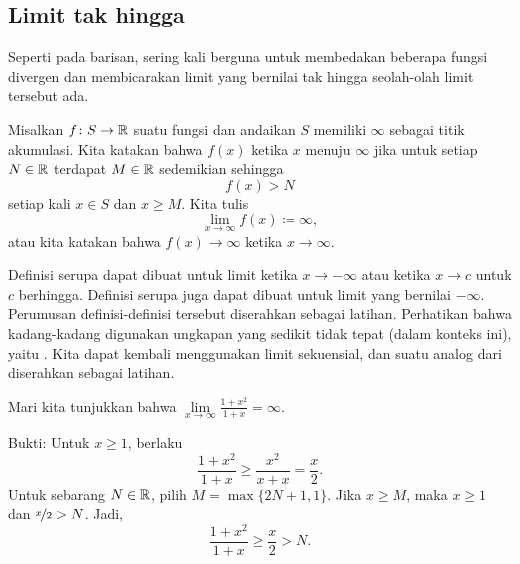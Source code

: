 \subsection{Limit tak hingga}

Seperti pada barisan, sering kali berguna untuk membedakan beberapa
fungsi divergen dan membicarakan limit yang bernilai tak hingga
seolah-olah limit tersebut ada.

\begin{defn}
%
Misalkan $f \colon S \to {\mathbb{R}}$ suatu fungsi dan andaikan
$S$ memiliki $\infty$ sebagai titik akumulasi.
Kita katakan bahwa $f(x)$
\emph{}
ketika $x$ menuju $\infty$
jika untuk setiap $N \in {\mathbb{R}}$
terdapat $M \in {\mathbb{R}}$ sedemikian sehingga
\begin{equation*}
f(x) > N
\end{equation*}
setiap kali $x \in S$ dan $x \geq M$.
Kita tulis
\begin{equation*}
\lim_{x \to \infty} f(x) \coloneqq \infty ,
\end{equation*}
atau kita katakan bahwa $f(x) \to \infty$ ketika $x \to \infty$.
\end{defn}

Definisi serupa dapat dibuat untuk limit ketika $x \to -\infty$
atau ketika $x \to c$ untuk $c$ berhingga.  Definisi serupa juga dapat
dibuat untuk limit yang bernilai $-\infty$.  Perumusan definisi-definisi tersebut
diserahkan sebagai latihan.
Perhatikan bahwa
kadang-kadang digunakan ungkapan yang sedikit tidak tepat (dalam konteks ini),
yaitu
\emph{}.
Kita dapat kembali menggunakan limit sekuensial, dan suatu analog dari
 diserahkan sebagai latihan.

\begin{example}
Mari kita tunjukkan bahwa $\lim\limits_{x \to \infty} \frac{1+x^2}{1+x} = \infty$.

Bukti: Untuk $x \geq 1$, berlaku
\begin{equation*}
\frac{1+x^2}{1+x} \geq 
\frac{x^2}{x+x}  = 
\frac{x}{2} .
\end{equation*}
Untuk sebarang $N \in {\mathbb{R}}$, pilih $M = \max \{ 2N+1 , 1 \}$.
Jika $x \geq M$, maka $x \geq 1$ dan $\nicefrac{x}{2} > N$.
Jadi,
\begin{equation*}
\frac{1+x^2}{1+x} \geq 
\frac{x}{2} > N .
\end{equation*}
\end{example}

